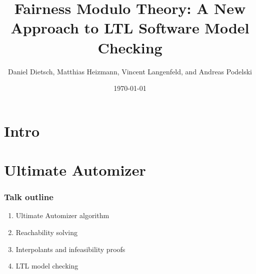 \documentclass[xcolor=dvipsnames]{beamer}
\title{Fairness Modulo Theory: A New Approach to LTL Software Model Checking}
\author{Daniel Dietsch, Matthias Heizmann, Vincent Langenfeld, and Andreas Podelski\vspace{-0.3cm}}
\institute{Presented by Henrich Lauko \vspace{1cm}}
\date{\today}
\let\otp\titlepage
\renewcommand{\titlepage}{\otp\addtocounter{framenumber}{-1}}
\begin{document}
\begin{frame}[plain]
 \titlepage
\end{frame}
\section{Intro}

\section{Ultimate Automizer}
\begin{frame}
	\frametitle{Talk outline}
    \begin{enumerate}[<+->]
            \item Ultimate Automizer algorithm
            \item Reachability solving
            \item Interpolants and infeasibility proofs
            \item LTL model checking
    \end{enumerate}
\end{frame}
\end{document}
